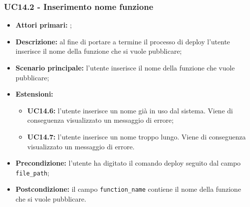 \subsubsection{UC14.2 - Inserimento nome funzione}
\begin{itemize}
	\item \textbf{Attori primari:} \us{};
	\item \textbf{Descrizione:} al fine di portare a termine il processo di deploy l’utente inserisce il nome della funzione che si vuole pubblicare;  
	\item \textbf{Scenario principale:} l'utente inserisce il nome della funzione che vuole pubblicare;
	\item \textbf{Estensioni:} 
	\begin{itemize}
		\item \textbf{UC14.6:} l’utente inserisce un nome già in uso dal sistema. Viene di conseguenza visualizzato un messaggio di errore; 
		\item \textbf{UC14.7:} l’utente inserisce un nome troppo lungo. Viene di conseguenza visualizzato un messaggio di errore. 
	\end{itemize}
	\item \textbf{Precondizione:} l’utente ha digitato il comando deploy seguito dal campo \texttt{file\_path};
	\item \textbf{Postcondizione:} il campo \texttt{function\_name} contiene il nome della funzione che si vuole pubblicare.
\end{itemize}